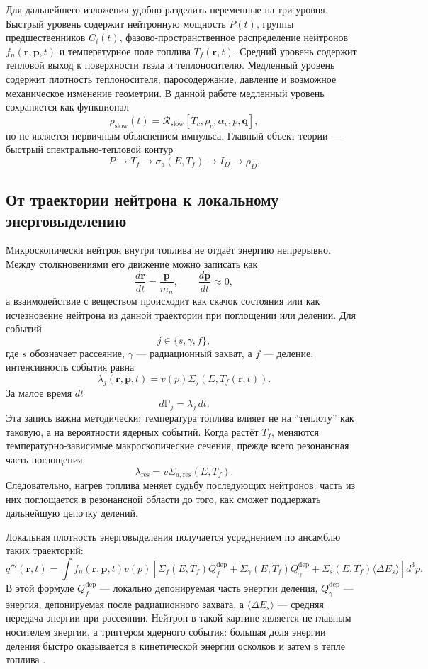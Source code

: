 \documentclass[12pt]{article}
\begin{document}
Для дальнейшего изложения удобно разделить переменные на три уровня. Быстрый уровень содержит нейтронную мощность \(P(t)\), группы предшественников \(C_i(t)\), фазово-пространственное распределение нейтронов \(f_n(\mathbf r,\mathbf p,t)\) и температурное поле топлива \(T_f(\mathbf r,t)\). Средний уровень содержит тепловой выход к поверхности твэла и теплоносителю. Медленный уровень содержит плотность теплоносителя, паросодержание, давление и возможное механическое изменение геометрии. В данной работе медленный уровень сохраняется как функционал
\[
\rho_{\mathrm{slow}}(t)
=
\mathcal R_{\mathrm{slow}}
[T_c,\rho_c,\alpha_v,p,\mathbf q],
\]
но не является первичным объяснением импульса. Главный объект теории --- быстрый спектрально-тепловой контур
\[
P\rightarrow T_f\rightarrow \sigma_a(E,T_f)\rightarrow I_D\rightarrow \rho_D.
\]

\subsection{От траектории нейтрона к локальному энерговыделению}

Микроскопически нейтрон внутри топлива не отдаёт энергию непрерывно. Между столкновениями его движение можно записать как
\[
\frac{d\mathbf r}{dt}=\frac{\mathbf p}{m_n},
\qquad
\frac{d\mathbf p}{dt}\approx0,
\]
а взаимодействие с веществом происходит как скачок состояния или как исчезновение нейтрона из данной траектории при поглощении или делении. Для событий
\[
j\in\{s,\gamma,f\},
\]
где \(s\) обозначает рассеяние, \(\gamma\) --- радиационный захват, а \(f\) --- деление, интенсивность события равна
\[
\lambda_j(\mathbf r,\mathbf p,t)
=
v(p)\Sigma_j(E,T_f(\mathbf r,t)).
\]
За малое время \(dt\)
\[
d\mathbb P_j=\lambda_j\,dt.
\]
Эта запись важна методически: температура топлива влияет не на ``теплоту'' как таковую, а на вероятности ядерных событий. Когда растёт \(T_f\), меняются температурно-зависимые макроскопические сечения, прежде всего резонансная часть поглощения
\[
\lambda_{\mathrm{res}}
=
v\Sigma_{a,\mathrm{res}}(E,T_f).
\]
Следовательно, нагрев топлива меняет судьбу последующих нейтронов: часть из них поглощается в резонансной области до того, как сможет поддержать дальнейшую цепочку делений.

Локальная плотность энерговыделения получается усреднением по ансамблю таких траекторий:
\[
q'''(\mathbf r,t)
=
\int
f_n(\mathbf r,\mathbf p,t)v(p)
\left[
\Sigma_f(E,T_f)Q_f^{\mathrm{dep}}
+
\Sigma_\gamma(E,T_f)Q_\gamma^{\mathrm{dep}}
+
\Sigma_s(E,T_f)\langle\Delta E_s\rangle
\right]d^3p.
\]
В этой формуле \(Q_f^{\mathrm{dep}}\) --- локально депонируемая часть энергии деления, \(Q_\gamma^{\mathrm{dep}}\) --- энергия, депонируемая после радиационного захвата, а \(\langle\Delta E_s\rangle\) --- средняя передача энергии при рассеянии. Нейтрон в такой картине является не главным носителем энергии, а триггером ядерного события: большая доля энергии деления быстро оказывается в кинетической энергии осколков и затем в тепле топлива \cite{DOEGeneralTechnicalBase2013}.
\end{document}
